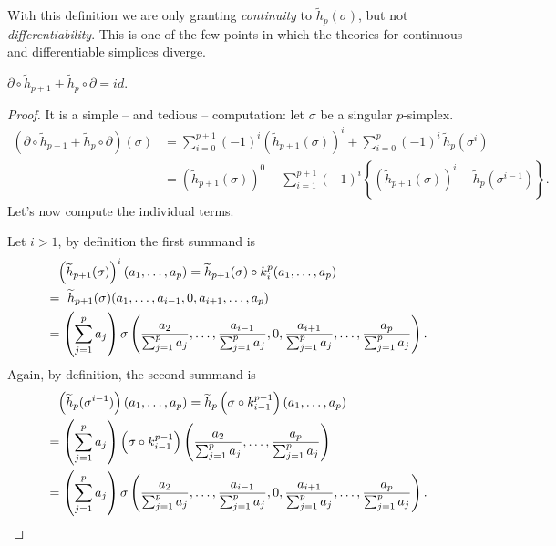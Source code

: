 \begin{rem}
	With this definition we are only granting \textit{continuity} to $\widetilde{h}_p(\sigma)$, but not \textit{differentiability}.
	This is one of the few points in which the theories for continuous and differentiable simplices diverge.
\end{rem}

\begin{lem}\label{lem:boundary_hom}
	$\partial \circ \widetilde{h}_{p+1} + \widetilde{h}_p \circ \partial = id$.
\end{lem} 
\begin{proof}
	It is a simple -- and tedious -- computation:
	let $\sigma$ be a singular $p$-simplex.
	\begin{align}
		\left(\partial \circ \widetilde{h}_{p+1} + \widetilde{h}_p \circ \partial\right)(\sigma) &= \sum_{i=0}^{p+1} (-1)^i  \left( \widetilde{h}_{p+1}(\sigma) \right)^i + \sum_{i=0}^{p} (-1)^i\, \widetilde{h}_p (\sigma^i)\\
													 &= \left( \widetilde{h}_{p+1}(\sigma) \right)^0 + \sum_{i=1}^{p+1} (-1)^i \left\{ \left( \widetilde{h}_{p+1}(\sigma) \right)^i - \widetilde{h}_p(\sigma^{i-1}) \right\}\label{eqn:defn_boundary_hom}
	.\end{align} 
	Let's now compute the individual terms.

	Let $i > 1$, by definition the first summand is
	\begin{align}
		&\hphantom{=} \left( \widetilde{h}_{p+1}(\sigma) \right)^i (a_1, \ldots, a_p) = \widetilde{h}_{p+1}(\sigma) \circ k_i^p (a_1, \ldots, a_p)\\ 
		&=\ \widetilde{h}_{p+1}(\sigma)(a_1, \ldots, a_{i-1}, 0, a_{i+1}, \ldots, a_p)\\
		&= \left( \sum_{j=1}^{p} a_j \right) \sigma\left(\frac{a_2}{\sum_{j=1}^{p} a_j}, \ldots, \frac{a_{i-1}}{\sum_{j=1}^{p} a_j}, 0, \frac{a_{i+1}}{\sum_{j=1}^{p} a_j}, \ldots, \frac{a_p}{\sum_{j=1}^{p} a_j} \right)
	.\end{align} 
	Again, by definition, the second summand is
	\begin{align}
		&\hphantom{=} \left( \widetilde{h}_{p}(\sigma^{i-1}) \right) (a_1, \ldots, a_p) = \widetilde{h}_{p}\left(\sigma \circ k_{i-1}^{p-1}\right) (a_1, \ldots, a_p)\\
		&= \left( \sum_{j=1}^{p} a_j \right) \left(\sigma \circ k_{i-1}^{p-1}\right) \left(\frac{a_2}{\sum_{j=1}^{p} a_j}, \ldots, \frac{a_p}{\sum_{j=1}^{p} a_j} \right)\\
		&= \left( \sum_{j=1}^{p} a_j \right) \sigma\left(\frac{a_2}{\sum_{j=1}^{p} a_j}, \ldots, \frac{a_{i-1}}{\sum_{j=1}^{p} a_j}, 0, \frac{a_{i+1}}{\sum_{j=1}^{p} a_j}, \ldots, \frac{a_p}{\sum_{j=1}^{p} a_j} \right)
	.\end{align} 


\end{proof}
